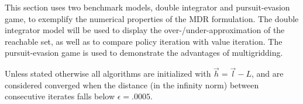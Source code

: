 This section uses two benchmark models, double integrator and pursuit-evasion game, to exemplify the numerical properties of the MDR formulation. The double integrator model will be used to display the over-/under-approximation of the reachable set, as well as to compare policy iteration with value iteration. The pursuit-evasion game is used to demonstrate the advantages of multigridding. 

Unless stated otherwise all algorithms are initialized with $\vec{h}=\vec{l}-L$, and are considered converged when the distance (in the infinity norm) between consecutive iterates falls below $\epsilon =.0005$.




